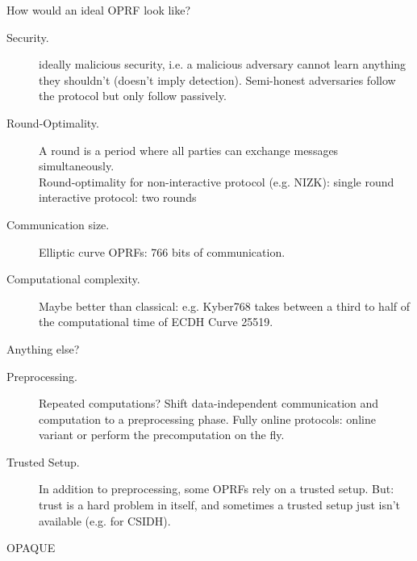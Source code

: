 \documentclass[aspectratio=169, 12pt,handout]{beamer}
\begin{document}
\begin{frame}{How would an ideal OPRF look like?}
  \begin{description}
    \item[Security.] ideally malicious security, i.e. a malicious adversary cannot
      learn anything they shouldn't \pause (doesn't imply detection). \pause
      Semi-honest adversaries follow the protocol but only follow passively. 
    \item[Round-Optimality.] A \alert{round} is a period where all parties can
      exchange messages simultaneously. \\ \pause Round-optimality for non-interactive protocol (e.g.  NIZK):
      single round\\ interactive protocol: two rounds \pause 
    \item[Communication size.] Elliptic curve OPRFs: 766
      bits of communication. \pause 
    \item[Computational complexity.] Maybe better than classical: e.g. Kyber768 takes between a third to half of the
      computational time of ECDH Curve 25519. 
  \end{description}
\end{frame}
\begin{frame}{Anything else?}
  \begin{description}
    \item[Preprocessing.]  Repeated
      computations? Shift data-independent communication and computation to a
      preprocessing phase.  \pause Fully online protocols: online variant or
      perform the precomputation on the fly.\pause
    \item[Trusted Setup.] In addition to preprocessing, some OPRFs rely on a
      trusted setup. \pause But: trust is a hard problem in itself,
      and sometimes a trusted setup just isn't available (e.g. for
      CSIDH).
  \end{description}
\end{frame}


\begin{frame}{OPAQUE}
  \vspace{-3em}
\end{frame}
\end{document}
